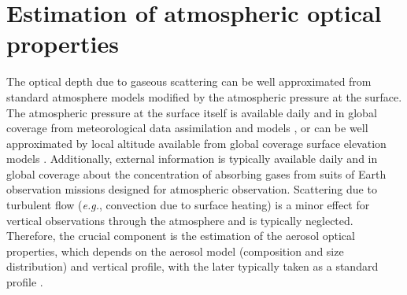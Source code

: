 \chapter{Estimation of atmospheric optical properties} \label{ch:ts_dsf}

The optical depth due to gaseous scattering \citep{Bodhaine1999} can be well approximated from standard atmosphere models \citep[\textit{e.g.},][]{US1976} modified by the atmospheric pressure at the surface. The atmospheric pressure at the surface itself is available daily and in global coverage from meteorological data assimilation and models \citep[\textit{e.g.}][]{Kanamitsu2002}, or can be well approximated by local altitude available from global coverage surface elevation models \citep[\textit{e.g.}][]{Airbus2022}. Additionally, external information is typically available daily and in global coverage about the concentration of absorbing gases from suits of Earth observation missions designed for atmospheric observation. Scattering due to turbulent flow (\textit{e.g.}, convection due to surface heating) is a minor effect for vertical observations through the atmosphere and is typically neglected. Therefore, the crucial component is the estimation of the aerosol optical properties, which depends on the aerosol model (composition and size distribution) and vertical profile, with the later typically taken as a standard profile \citep[\textit{e.g.},][]{Hess1998}.

